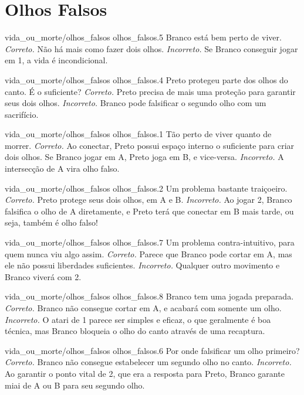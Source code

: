 \chapter{Olhos Falsos}

\emptypage

\problemAnswerDiagram
  {vida_ou_morte/olhos_falsos}
  {olhos_falsos.5}
  {Branco está bem perto de viver.}
  {\emph{Correto.} Não há mais como fazer dois olhos.}
  {\emph{Incorreto.} Se Branco conseguir jogar em 1, a vida é incondicional.}

\problemAnswerDiagram
  {vida_ou_morte/olhos_falsos}
  {olhos_falsos.4}
  {Preto protegeu parte dos olhos do canto. É o suficiente?}
  {\emph{Correto.} Preto precisa de mais uma proteção para garantir seus dois olhos.}
  {\emph{Incorreto.} Branco pode falsificar o segundo olho com um sacrifício.}

\problemAnswerDiagram
  {vida_ou_morte/olhos_falsos}
  {olhos_falsos.1}
  {Tão perto de viver quanto de morrer.}
  {\emph{Correto.} Ao conectar, Preto possui espaço interno o suficiente para criar dois olhos. Se Branco jogar em A, Preto joga em B, e vice-versa.}
  {\emph{Incorreto.} A intersecção de A vira olho falso.}

\problemAnswerDiagram
  {vida_ou_morte/olhos_falsos}
  {olhos_falsos.2}
  {Um problema bastante traiçoeiro.}
  {\emph{Correto.} Preto protege seus dois olhos, em A e B.}
  {\emph{Incorreto.} Ao jogar 2, Branco falsifica o olho de A diretamente, e Preto terá que conectar em B mais tarde, ou seja, também é olho falso!}

\problemAnswerDiagram
  {vida_ou_morte/olhos_falsos}
  {olhos_falsos.7}
  {Um problema contra-intuitivo, para quem nunca viu algo assim.}
  {\emph{Correto.} Parece que Branco pode cortar em A, mas ele não possui liberdades suficientes.}
  {\emph{Incorreto.} Qualquer outro movimento e Branco viverá com 2.}

\problemAnswerDiagram
  {vida_ou_morte/olhos_falsos}
  {olhos_falsos.8}
  {Branco tem uma jogada preparada.}
  {\emph{Correto.} Branco não consegue cortar em A, e acabará com somente um olho.}
  {\emph{Incorreto.} O atari de 1 parece ser simples e eficaz, o que geralmente é boa técnica, mas Branco bloqueia o olho do canto através de uma recaptura.}

\problemAnswerDiagram
  {vida_ou_morte/olhos_falsos}
  {olhos_falsos.6}
  {Por onde falsificar um olho primeiro?}
  {\emph{Correto.} Branco não consegue estabelecer um segundo olho no canto.}
  {\emph{Incorreto.} Ao garantir o ponto vital de 2, que era a resposta para Preto, Branco garante miai de A ou B para seu segundo olho.}